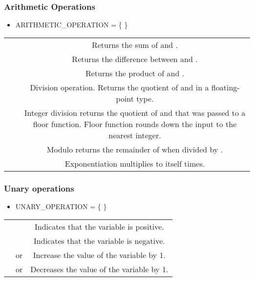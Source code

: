 \subsubsection{Arithmetic Operations}
\begin{itemize}
  \item ARITHMETIC\_OPERATION = \{ \cd{ +, -, *, /, //, \%, \^{} } \}
\end{itemize}
\begin{center}
\begin{tabulary}{\linewidth}{|C|C|C|}
  \hline
   &  &  \\
  \hline
  \hline
  \cd{+} &  & Returns the sum of  and .\\
  \hline
  \cd{-} &  & Returns the difference between  and . \\
  \hline
  \cd{*} &  & Returns the product of  and . \\
  \hline
  \cd{/} &  & Division operation. Returns the quotient of  and  in a floating-point type. \\
  \hline
  \cd{//} &  & Integer division returns the quotient of  and  that was passed to a floor function. Floor function rounds down the input to the nearest integer. \\
  \hline
  \cd{\%} &  & Modulo returns the remainder of  when divided by . \\
  \hline
  \cd{\^{}} &  & Exponentiation multiplies  to itself  times. \\
  \hline
\end{tabulary}
\end{center}

\subsubsection{Unary operations}
\begin{itemize}
  \item UNARY\_OPERATION = \{ \cd{ +, -, ++, {-}{-} } \}
\end{itemize}
\begin{center}
\begin{tabulary}{\linewidth}{|C|C|C|}
  \hline
   &  &  \\
  \hline
  \hline
  \cd{+} &  & Indicates that the variable is positive. \\
  \hline
  \cd{-} &  & Indicates that the variable is negative. \\
  \hline
  \cd{++} &  or  & Increase the value of the variable by 1. \\
  \hline
  \cd{{-}{-}} &  or  & Decreases the value of the variable by 1.\\
  \hline
\end{tabulary}
\end{center}


